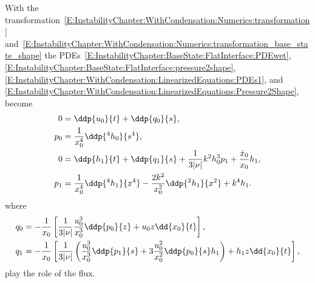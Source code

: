 \begin{subappendices}
With the transformation~\eqref{E:InstabilityChapter:WithCondensation:Numerics:transformation} and~\eqref{E:InstabilityChapter:WithCondensation:Numerics:transformation_base_state_shape} the PDEs~\eqref{E:InstabilityChapter:BaseState:FlatInterface:PDEwet}, \eqref{E:InstabilityChapter:BaseState:FlatInterface:pressure2shape}, \eqref{E:InstabilityChapter:WithCondensation:LinearizedEquations:PDEs1}, and \eqref{E:InstabilityChapter:WithCondensation:LinearizedEquations:Pressure2Shape}, become
\begin{align}
0& = \ddp{u_0}{t} + \ddp{q_0}{s},\label{A:E:Ch6:Numerics:Transformation:FluxConsEqBaseState}\\
p_0 &= \frac{1}{x_0^4} \ddp{^4 h_0}{s^4},\label{A:E:Ch6:Numerics:Transformation:Pressure2ShapeBaseState}\\
0&= \ddp{h_1}{t} +  \ddp{q_1}{s} +  \frac{1}{3|\nu|} k^2 h_0^3 p_1  + \frac{\dot{x}_0}{x_0}h_1,\label{A:E:Ch6:Numerics:Transformation:FluxConsPerturbation}\\
p_1 &= \frac{1}{x_0^4}\ddp{^4 h_1}{x^4} - \frac{2k^2}{x_0^2} \ddp{^2 h_1}{x^2}  + k^4 h_1.\label{A:E:Ch6:Numerics:Transformation:Pressure2ShapePerturbation}
\end{align}
where
\begin{align}
q_0 & = -\frac{1}{x_0}\left[\frac{1}{3|\nu|}\frac{u_0^3}{x_0^3}\ddp{p_0}{z}  + u_0 z\dd{x_0}{t} \right],\label{A:E:Ch6:Numerics:Transformation:BaseStateFlux}\\
q_1 &= - \frac{1}{x_0}\left[\frac{1}{3|\nu|}\left(\frac{u_0^3}{x_0^3}\ddp{p_1}{s} + 3\frac{u_0^2}{x_0^2} \ddp{p_0}{s}h_1\right) +   h_1 z\dd{x_0}{t} \right],\label{A:E:Ch6:Numerics:Transformation:PerturbationFlux}
\end{align}
play the role of the flux.


\end{subappendices}
